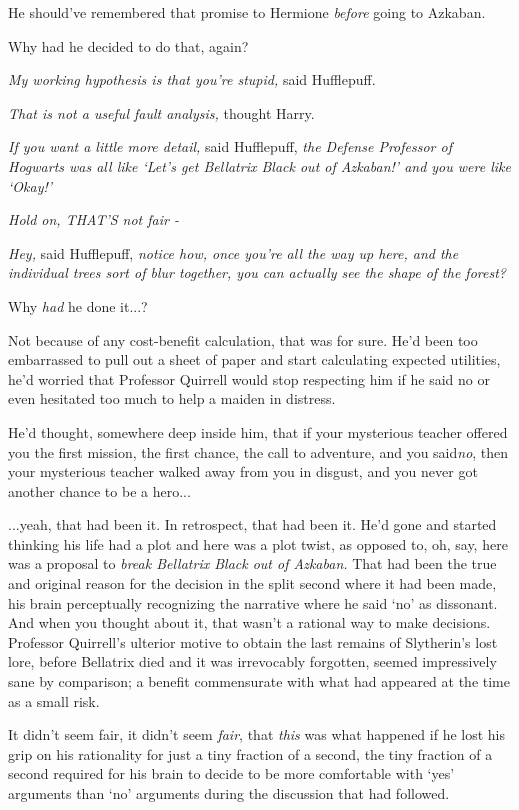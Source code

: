 He should've remembered that promise to Hermione \emph{before} going to
Azkaban.

Why had he decided to do that, again?

\emph{My working hypothesis is that you're stupid,} said Hufflepuff.

\emph{That is not a useful fault analysis,} thought Harry.

\emph{If you want a little more detail,} said Hufflepuff, \emph{the
Defense Professor of Hogwarts was all like `Let's get Bellatrix Black
out of Azkaban!' and you were like `Okay!'}

\emph{Hold on, THAT'S not fair -}

\emph{Hey,} said Hufflepuff, \emph{notice how, once you're all the way
up here, and the individual trees sort of blur together, you can
actually see the shape of the forest?}

Why \emph{had} he done it...?

Not because of any cost-benefit calculation, that was for sure. He'd
been too embarrassed to pull out a sheet of paper and start calculating
expected utilities, he'd worried that Professor Quirrell would stop
respecting him if he said no or even hesitated too much to help a maiden
in distress.

He'd thought, somewhere deep inside him, that if your mysterious teacher
offered you the first mission, the first chance, the call to adventure,
and you said\emph{no}, then your mysterious teacher walked away from you
in disgust, and you never got another chance to be a hero...

...yeah, that had been it. In retrospect, that had been it. He'd
gone and started thinking his life had a plot and here was a plot twist,
as opposed to, oh, say, here was a proposal to \emph{break Bellatrix
Black out of Azkaban.} That had been the true and original reason for
the decision in the split second where it had been made, his brain
perceptually recognizing the narrative where he said `no' as dissonant.
And when you thought about it, that wasn't a rational way to make
decisions. Professor Quirrell's ulterior motive to obtain the last
remains of Slytherin's lost lore, before Bellatrix died and it was
irrevocably forgotten, seemed impressively sane by comparison; a benefit
commensurate with what had appeared at the time as a small risk.

It didn't seem fair, it didn't seem \emph{fair}, that \emph{this} was
what happened if he lost his grip on his rationality for just a tiny
fraction of a second, the tiny fraction of a second required for his
brain to decide to be more comfortable with `yes' arguments than `no'
arguments during the discussion that had followed.


